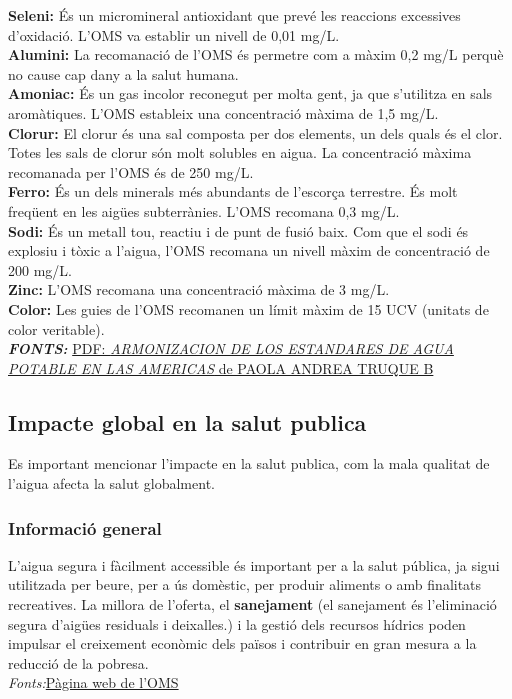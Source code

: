 \textbf{Seleni:} És un micromineral antioxidant que prevé les reaccions excessives d’oxidació. L’OMS va establir un nivell de 0,01 mg/L.\\

\textbf{Alumini:} La recomanació de l’OMS és permetre com a màxim 0,2 mg/L perquè no cause cap dany a la salut humana.\\

\textbf{Amoniac:} És un gas incolor reconegut per molta gent, ja que s’utilitza en sals aromàtiques. L’OMS estableix una concentració màxima de 1,5 mg/L.\\

\textbf{Clorur:} El clorur és una sal composta per dos elements, un dels quals és el clor. Totes les sals de clorur són molt solubles en aigua. La concentració màxima recomanada per l’OMS és de 250 mg/L.\\

\textbf{Ferro:} És un dels minerals més abundants de l’escorça terrestre. És molt freqüent en les aigües subterrànies. L’OMS recomana 0,3 mg/L.\\

\textbf{Sodi:} És un metall tou, reactiu i de punt de fusió baix. Com que el sodi és explosiu i tòxic a l’aigua, l’OMS recomana un nivell màxim de concentració de 200 mg/L.\\

\textbf{Zinc:} L’OMS recomana una concentració màxima de 3 mg/L.\\

\textbf{Color:} Les guies de l’OMS recomanen un límit màxim de 15 UCV (unitats de color veritable).\\

\textit{\textbf{FONTS:}} \href{https://www.oas.org/dsd/publications/classifications/Armoniz.EstandaresAguaPotable.pdf}{PDF: \textit{ARMONIZACION DE LOS ESTANDARES DE AGUA POTABLE EN LAS
AMERICAS} de PAOLA ANDREA TRUQUE B}\\

\subsection{Impacte global en la salut publica}
Es important mencionar l'impacte en la salut publica, com la mala qualitat de l'aigua afecta la salut globalment.
\subsubsection{Informació general}
L'aigua segura i fàcilment accessible és important per a la salut pública, ja sigui utilitzada per beure, per a ús domèstic, per produir aliments o amb finalitats recreatives. La millora de l'oferta, el \textbf{sanejament} (el sanejament és l’eliminació segura d’aigües residuals i deixalles.) i la gestió dels recursos hídrics poden impulsar el creixement econòmic dels països i contribuir en gran mesura a la reducció de la pobresa. \\
\textit{Fonts:}\href{https://https://www.who.int/es/news-room/fact-sheets/detail/drinking-water}{Pàgina web de l'OMS}\\

